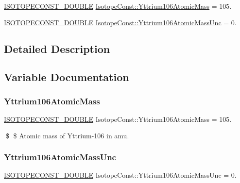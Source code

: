 \begin{DoxyCompactItemize}
\item 
\mbox{\hyperlink{group___isotope_const-_macros_ga8f45a7272ce02c0b4c65c44636ed719a}{I\+S\+O\+T\+O\+P\+E\+C\+O\+N\+S\+T\+\_\+\+D\+O\+U\+B\+LE}} \mbox{\hyperlink{group___isotope_const-_yttrium-_y106_ga9b5556120614a35486dbbfb81ea95ce1}{Isotope\+Const\+::\+Yttrium106\+Atomic\+Mass}} = 105.
\item 
\mbox{\hyperlink{group___isotope_const-_macros_ga8f45a7272ce02c0b4c65c44636ed719a}{I\+S\+O\+T\+O\+P\+E\+C\+O\+N\+S\+T\+\_\+\+D\+O\+U\+B\+LE}} \mbox{\hyperlink{group___isotope_const-_yttrium-_y106_ga132015a54c8df3de6fd778bd7cc4f35a}{Isotope\+Const\+::\+Yttrium106\+Atomic\+Mass\+Unc}} = 0.
\end{DoxyCompactItemize}


\subsection{Detailed Description}


\subsection{Variable Documentation}
\mbox{\label{group___isotope_const-_yttrium-_y106_ga9b5556120614a35486dbbfb81ea95ce1}} 
\subsubsection{\texorpdfstring{Yttrium106\+Atomic\+Mass}{Yttrium106AtomicMass}}
{\footnotesize\ttfamily \mbox{\hyperlink{group___isotope_const-_macros_ga8f45a7272ce02c0b4c65c44636ed719a}{I\+S\+O\+T\+O\+P\+E\+C\+O\+N\+S\+T\+\_\+\+D\+O\+U\+B\+LE}} Isotope\+Const\+::\+Yttrium106\+Atomic\+Mass = 105.}

\$ \$ Atomic mass of Yttrium-\/106 in amu. \mbox{\label{group___isotope_const-_yttrium-_y106_ga132015a54c8df3de6fd778bd7cc4f35a}} 
\subsubsection{\texorpdfstring{Yttrium106\+Atomic\+Mass\+Unc}{Yttrium106AtomicMassUnc}}
{\footnotesize\ttfamily \mbox{\hyperlink{group___isotope_const-_macros_ga8f45a7272ce02c0b4c65c44636ed719a}{I\+S\+O\+T\+O\+P\+E\+C\+O\+N\+S\+T\+\_\+\+D\+O\+U\+B\+LE}} Isotope\+Const\+::\+Yttrium106\+Atomic\+Mass\+Unc = 0.}

